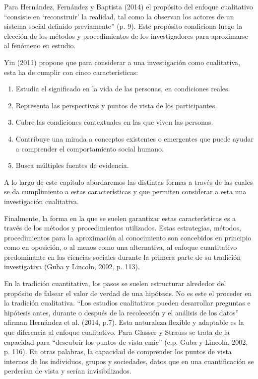 Para Hernández, Fernández y Baptista (2014) el propósito del enfoque cualitativo
“consiste en ‘reconstruir’ la realidad, tal como la observan los actores de un
sistema social definido previamente” (p. 9).
Este propósito condiciona luego la elección de los métodos y procedimientos de
los investigadores para aproximarse al fenómeno en estudio.

Yin (2011) propone que para considerar a una investigación como cualitativa,
esta ha de cumplir con cinco características:

\begin{enumerate}
    \item Estudia el significado en la vida de las personas, en condiciones
    reales.
    \item Representa las perspectivas y puntos de vista de los participantes.
    \item Cubre las condiciones contextuales en las que viven las personas.
    \item Contribuye una mirada a conceptos existentes o emergentes que puede
    ayudar a comprender el comportamiento social humano.
    \item Busca múltiples fuentes de evidencia.
\end{enumerate}

A lo largo de este capítulo abordaremos las distintas formas a través de las
cuales se da cumplimiento a estas características y que permiten considerar a
esta una investigación cualitativa.

Finalmente, la forma en la que se suelen garantizar estas características es a
través de los métodos y procedimientos utilizados.
Estas estrategias, métodos, procedimientos para la aproximación al conocimiento
son concebidos en principio como en oposición, o al menos como una alternativa,
al enfoque cuantitativo predominante en las ciencias sociales durante la primera
parte de su tradición investigativa (Guba y Lincoln, 2002, p. 113).

En la tradición cuantitativa, los pasos se suelen estructurar alrededor del
propósito de falsear el valor de verdad de una hipótesis.
No es este el proceder en la tradición cualitativa.
“Los estudios cualitativos pueden desarrollar preguntas e hipótesis antes,
durante o después de la recolección y el análisis de los datos” afirman
Hernández et al. (2014, p.7).
Esta naturaleza flexible y adaptable es la que diferencia al enfoque
cualitativo.
Para Glasser y Strauss se trata de la capacidad para “descubrir los puntos de
vista emic” (c.p. Guba y Lincoln, 2002, p. 116).
En otras palabras, la capacidad de comprender los puntos de vista internos de
los individuos, grupos y sociedades, datos que en una cuantificación se
perderían de vista y serían invisibilizados.

